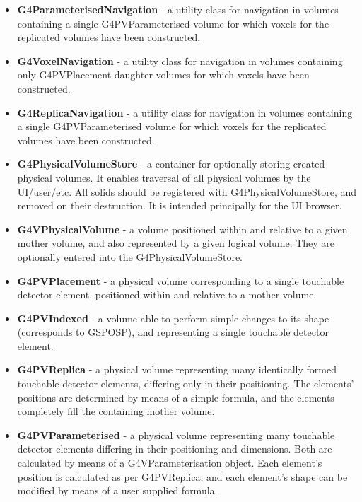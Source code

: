 \begin{itemize}
\item {\bf G4ParameterisedNavigation} -
   a utility class for navigation in volumes containing a single 
   G4PVParameterised volume for which voxels for the replicated volumes have 
   been constructed.
 
\item {\bf G4VoxelNavigation} -
   a utility class for navigation in volumes containing only G4PVPlacement 
   daughter volumes for which voxels have been constructed.
 
\item {\bf G4ReplicaNavigation} -
   a utility class for navigation in volumes containing a single 
   G4PVParameterised volume for which voxels for the replicated volumes 
   have been constructed. 

\item {\bf G4PhysicalVolumeStore} -
   a container for optionally storing created physical volumes. It enables 
   traversal of all physical volumes by the UI/user/etc.  All solids should 
   be registered with G4PhysicalVolumeStore, and removed on their destruction. 
   It is intended principally for the UI browser.
 
\item {\bf G4VPhysicalVolume} -
   a volume positioned within and relative to a given mother volume, and also 
   represented by a given logical volume.  They are optionally entered into 
   the G4PhysicalVolumeStore. 

\item {\bf G4PVPlacement} -
   a physical volume corresponding to a single touchable detector element, 
   positioned within and relative to a mother volume.
 
\item {\bf G4PVIndexed} -
   a volume able to perform simple changes to its shape (corresponds to 
   GSPOSP), and representing a single touchable detector element.
 
\item {\bf G4PVReplica} -
   a physical volume representing many identically formed touchable detector 
   elements, differing only in their positioning.  The elements' positions 
   are determined by means of a simple formula, and the elements completely 
   fill the containing mother volume.
 
\item {\bf G4PVParameterised} -
   a physical volume representing many touchable detector elements differing 
   in their positioning and dimensions.  Both are calculated by means of a 
   G4VParameterisation object.  Each element's position is calculated as per 
   G4PVReplica, and each element's shape can be modified by means of a user 
   supplied formula.
 

\end{itemize}
